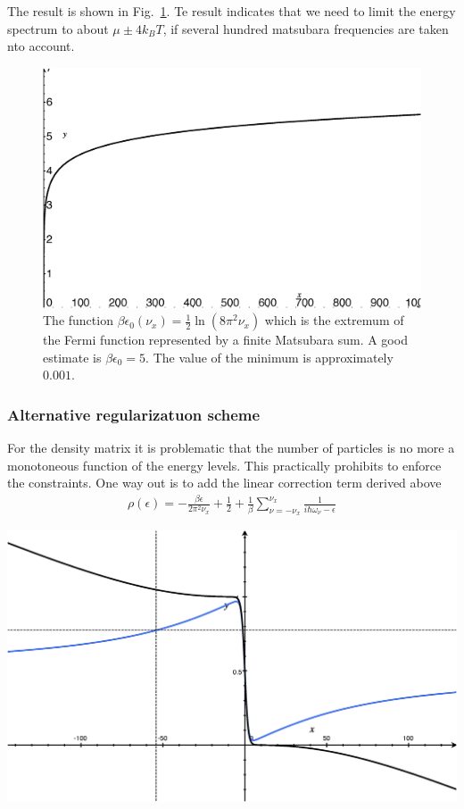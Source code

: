 \documentclass[11pt,a4paper]{report}
\begin{document}
The result is shown in Fig.~\ref{fig:fermifinitematsubaraextremum}. Te
result indicates that we need to limit the energy spectrum to about
$\mu\pm 4k_BT$, if several hundred matsubara frequencies are taken nto
account.
\begin{figure}[h!]
\begin{center}
\includegraphics[width=0.5\linewidth]{Figs/fermifinitematsubaraextremum.eps}
\end{center}
\caption{\label{fig:fermifinitematsubaraextremum} The function
  $\beta\epsilon_0(\nu_x)=\frac{1}{2}\ln\left(8\pi^2\nu_x\right)$
  which is the extremum of the Fermi function represented by a finite
  Matsubara sum. A good estimate is $\beta\epsilon_0=5$. The value of
  the minimum is approximately $0.001$.}
\end{figure}

\subsubsection{Alternative regularizatuon scheme}
For the density matrix it is problematic that the number of particles
is no more a monotoneous function of the energy levels. This
practically prohibits to enforce the constraints. One way out is to
add the linear correction term derived above
\begin{eqnarray}
\rho(\epsilon)=-\frac{\beta\epsilon}{2\pi^2\nu_x}+\frac{1}{2}+
\frac{1}{\beta}\sum_{\nu=-\nu_x}^{\nu_x}
\frac{1}{i\hbar\omega_\nu-\epsilon}
\end{eqnarray}

\begin{center}
\includegraphics[width=0.5\linewidth]{Figs/rhocorrectedmatsubara.eps}
\end{center}
\end{document}
